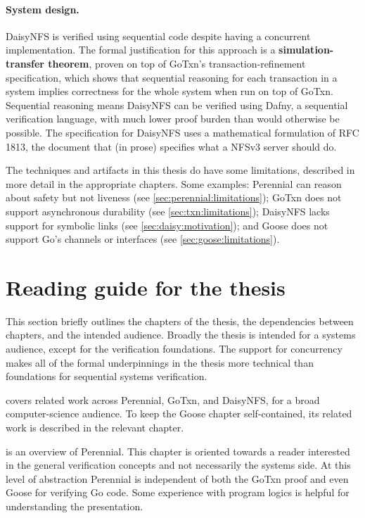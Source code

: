 \paragraph{System design.}
DaisyNFS is verified using sequential code despite having a concurrent
implementation. The formal justification for this approach is a
\textbf{simulation-transfer theorem}, proven on top of GoTxn's
transaction-refinement specification, which shows that sequential reasoning for each
transaction in a system implies correctness for the whole system when run on top
of GoTxn. Sequential reasoning means DaisyNFS can be verified using Dafny, a
sequential verification language, with much lower proof burden than would
otherwise be possible. The specification for DaisyNFS uses a mathematical
formulation of RFC 1813, the document that (in prose) specifies what a NFSv3
server should do.

The techniques and artifacts in this thesis do have some limitations, described
in more detail in the appropriate chapters. Some examples: Perennial can reason
about safety but not liveness (see \cref{sec:perennial:limitations}); GoTxn does
not support asynchronous durability (see \cref{sec:txn:limitations}); DaisyNFS
lacks support for symbolic links (see \cref{sec:daisy:motivation}); and Goose
does not support Go's channels or interfaces (see \cref{sec:goose:limitations}).

\section{Reading guide for the thesis}
\label{sec:intro:reading-guide}

This section briefly outlines the chapters of the thesis, the dependencies
between chapters, and the intended audience. Broadly the thesis is intended for
a systems audience, except for the verification foundations. The support for
concurrency makes all of the formal underpinnings in the thesis more technical
than foundations for sequential systems verification.

 covers related work across Perennial, GoTxn, and DaisyNFS, for
a broad computer-science audience. To keep the Goose chapter self-contained, its
related work is described in the relevant chapter.

 is an overview of Perennial. This chapter is oriented
towards a reader interested in the general verification concepts and not
necessarily the systems side. At this level of abstraction Perennial is
independent of both the GoTxn proof and even Goose for verifying Go code. Some
experience with program logics is helpful for understanding the presentation.

